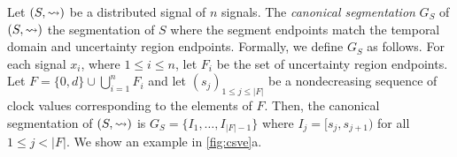 
Let $(S,{\rightsquigarrow})$ be a distributed signal of $n$ signals.
The \emph{canonical segmentation} $G_S$ of $(S,{\rightsquigarrow})$ the segmentation of $S$ where the segment endpoints match the temporal domain and uncertainty region endpoints.
Formally, we define $G_S$ as follows.
For each signal $x_i$, where $1 \leq i \leq n$, let $F_i$ be the set of uncertainty region endpoints.
Let $F = \{0, d\} \cup \bigcup_{i = 1}^{n} F_i$ and let $(s_j)_{1 \leq j \leq |F|}$ be a nondecreasing sequence of clock values corresponding to the elements of $F$.
Then, the canonical segmentation of $(S,{\rightsquigarrow})$ is $G_S = \{I_1, \ldots, I_{|F| - 1}\}$ where $I_j = [s_j, s_{j+1})$ for all $1 \leq j < |F|$.
We show an example in \cref{fig:csve}a.



